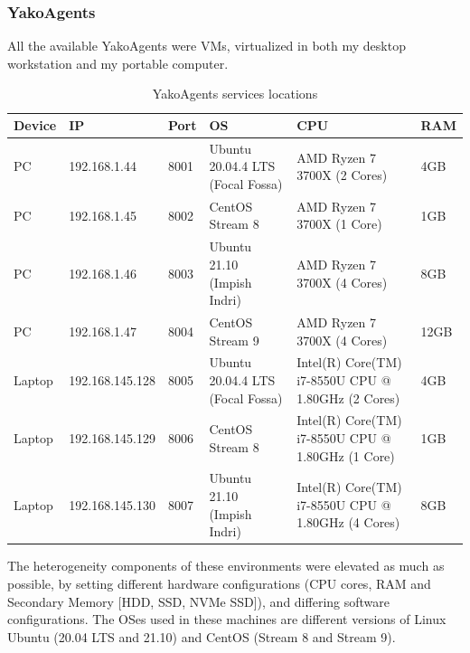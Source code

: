         \subsubsection{YakoAgents}
            All the available YakoAgents were VMs, virtualized in both my desktop workstation and my portable computer.
            
            \begin{table}[H]
                \centering
                \caption{YakoAgents services locations}
                \label{tab:test_yakoagents}
                \begin{tabularx}{\linewidth}{|l|l|l|X|X|l|}
                    \hline
                    \rowcolor[HTML]{C0C0C0}
                    \textbf{Device} & \textbf{IP} & \textbf{Port} & \textbf{OS} & \textbf{CPU} & \textbf{RAM} \\ \hline
                    PC & 192.168.1.44 & 8001 & Ubuntu 20.04.4 LTS (Focal Fossa) & AMD Ryzen 7 3700X (2 Cores) & 4GB \\ \hline
                    PC & 192.168.1.45 & 8002 & CentOS Stream 8 & AMD Ryzen 7 3700X (1 Core) & 1GB \\ \hline
                    PC & 192.168.1.46 & 8003 & Ubuntu 21.10 (Impish Indri) & AMD Ryzen 7 3700X (4 Cores) & 8GB \\ \hline
                    PC & 192.168.1.47 & 8004 & CentOS Stream 9 & AMD Ryzen 7 3700X (4 Cores) & 12GB \\ \hline
                    
                    Laptop & 192.168.145.128 & 8005 & Ubuntu 20.04.4 LTS (Focal Fossa) & Intel(R) Core(TM) i7-8550U CPU @ 1.80GHz (2 Cores) &  4GB \\ \hline
                    Laptop & 192.168.145.129 & 8006 & CentOS Stream 8 & Intel(R) Core(TM) i7-8550U CPU @ 1.80GHz (1 Core) & 1GB \\ \hline
                    Laptop & 192.168.145.130 & 8007 & Ubuntu 21.10 (Impish Indri) & Intel(R) Core(TM) i7-8550U CPU @ 1.80GHz (4 Cores) & 8GB \\ \hline
                \end{tabularx}
            \end{table}
            
            The heterogeneity components of these environments were elevated as much as possible, by setting different hardware configurations (CPU cores, RAM and Secondary Memory [HDD, SSD, NVMe SSD]), and differing software configurations. The OSes used in these machines are different versions of Linux Ubuntu (20.04 LTS and 21.10) and CentOS (Stream 8 and Stream 9).
        
